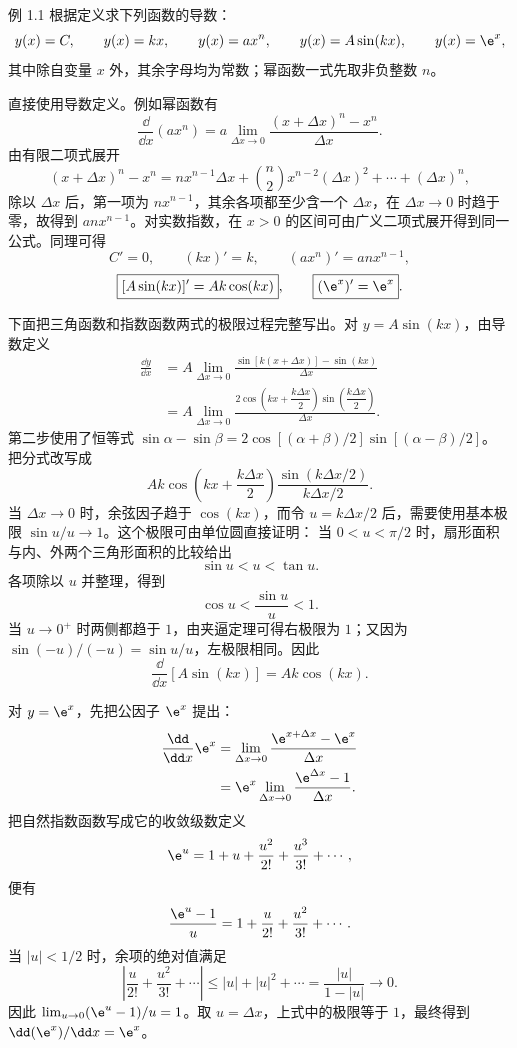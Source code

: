 

\begin{origexamplebox}{例 1.1}
根据定义求下列函数的导数：
\[
 y(x)=C,\qquad y(x)=kx,\qquad y(x)=ax^n,\qquad
 y(x)=A\sin(kx),\qquad y(x)=\e^x,
\]
其中除自变量 $x$ 外，其余字母均为常数；幂函数一式先取非负整数 $n$。
\end{origexamplebox}

\begin{xesolution}
直接使用导数定义。例如幂函数有
\[
 \frac{\dd}{\dd x}(ax^n)
 =a\lim_{\Delta x\to0}
 \frac{(x+\Delta x)^n-x^n}{\Delta x}.
\]
由有限二项式展开
\[
 (x+\Delta x)^n-x^n
 =nx^{n-1}\Delta x+\binom n2x^{n-2}(\Delta x)^2+\cdots+(\Delta x)^n,
\]
除以 $\Delta x$ 后，第一项为 $nx^{n-1}$，其余各项都至少含一个 $\Delta x$，在
$\Delta x\to0$ 时趋于零，故得到 $anx^{n-1}$。对实数指数，在 $x>0$ 的区间可由广义二项式展开得到同一公式。同理可得
\[
 \boxed{C'=0},\qquad
 \boxed{(kx)'=k},\qquad
 \boxed{(ax^n)'=anx^{n-1}},
\]
\[
 \boxed{[A\sin(kx)]'=Ak\cos(kx)},\qquad
 \boxed{(\e^x)'=\e^x}.
\]

下面把三角函数和指数函数两式的极限过程完整写出。对 $y=A\sin(kx)$，由导数定义
\begin{align*}
 \frac{\dd y}{\dd x}
 &=A\lim_{\Delta x\to0}
 \frac{\sin[k(x+\Delta x)]-\sin(kx)}{\Delta x}\\
 &=A\lim_{\Delta x\to0}
 \frac{2\cos\!\left(kx+\dfrac{k\Delta x}{2}\right)
       \sin\!\left(\dfrac{k\Delta x}{2}\right)}{\Delta x}.
\end{align*}
第二步使用了恒等式
$\sin\alpha-\sin\beta
=2\cos[(\alpha+\beta)/2]\sin[(\alpha-\beta)/2]$。
把分式改写成
\[
 Ak\cos\!\left(kx+\frac{k\Delta x}{2}\right)
 \frac{\sin(k\Delta x/2)}{k\Delta x/2}.
\]
当 $\Delta x\to0$ 时，余弦因子趋于 $\cos(kx)$，而令
$u=k\Delta x/2$ 后，需要使用基本极限 $\sin u/u\to1$。这个极限可由单位圆直接证明：
当 $0<u<\pi/2$ 时，扇形面积与内、外两个三角形面积的比较给出
\[
 \sin u<u<\tan u.
\]
各项除以 $u$ 并整理，得到
\[
 \cos u<\frac{\sin u}{u}<1.
\]
当 $u\to0^+$ 时两侧都趋于 $1$，由夹逼定理可得右极限为 $1$；又因为
$\sin(-u)/(-u)=\sin u/u$，左极限相同。因此
\[
 \frac{\dd}{\dd x}[A\sin(kx)]=Ak\cos(kx).
\]

对 $y=\e^x$，先把公因子 $\e^x$ 提出：
\begin{align*}
 \frac{\dd}{\dd x}\e^x
 &=\lim_{\Delta x\to0}
 \frac{\e^{x+\Delta x}-\e^x}{\Delta x}\\
 &=\e^x\lim_{\Delta x\to0}
 \frac{\e^{\Delta x}-1}{\Delta x}.
\end{align*}
把自然指数函数写成它的收敛级数定义
\[
 \e^u=1+u+\frac{u^2}{2!}+\frac{u^3}{3!}+\cdots,
\]
便有
\[
 \frac{\e^u-1}{u}
 =1+\frac{u}{2!}+\frac{u^2}{3!}+\cdots.
\]
当 $|u|<1/2$ 时，余项的绝对值满足
\[
 \left|\frac{u}{2!}+\frac{u^2}{3!}+\cdots\right|
 \le |u|+|u|^2+\cdots=\frac{|u|}{1-|u|}\longrightarrow0.
\]
因此 $\lim_{u\to0}(\e^u-1)/u=1$。取 $u=\Delta x$，上式中的极限等于 $1$，最终得到
$\dd(\e^x)/\dd x=\e^x$。
\end{xesolution}

